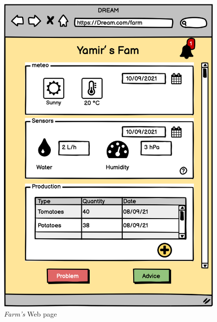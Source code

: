 \begin{figure}[H]
    \begin{minipage}{0.4\textwidth}
        \centering
        \includegraphics[width=1\textwidth]{images/mockups/FFarm.png}
        \caption{\emph{Farm's} Web page}
        \label{fig:farm}
    \end{minipage}\hfill
    \begin{minipage}{0.39\textwidth}
        \centering

\end{minipage}
\end{figure}
